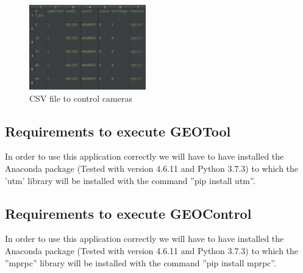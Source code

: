 \documentclass[10pt,a4paper,twocolumn,twoside]{article}
\begin{document}
\begin{figure}[!h]
\centering
  	\includegraphics[width=0.45\textwidth]{fitxercameres}
  	\captionsetup{labelformat=empty}
	\caption{CSV file to control cameras}
	\label{fig-fitxercameres}
\end{figure}

\newpage
\subsection{Requirements to execute GEOTool}
\label{appendix:requirementsgeotool}

In order to use this application correctly we will have to have installed the Anaconda package (Tested with version 4.6.11 and Python 3.7.3) to which the 'utm' library will be installed with the command ''pip install utm''.

\subsection{Requirements to execute GEOControl}
\label{appendix:requirementsgeocontrol}

In order to use this application correctly we will have to have installed the Anaconda package (Tested with version 4.6.11 and Python 3.7.3) to which the ''mprpc'' library will be installed with the command ''pip install mprpc''.
\end{document}
